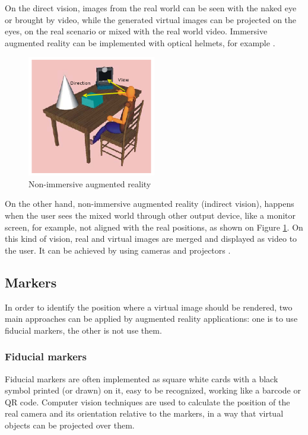 \documentclass[msc, a4paper, classic, en]{ufbathesis}
\begin{document}
On the direct vision, images from the real world can be seen with the naked eye or brought by video, while the generated virtual images can be projected on the eyes, on the real scenario or mixed with the real world video. Immersive augmented reality can be implemented with optical helmets, for example \cite{tori2006fundamentos}.

\begin{figure}
\centering
\includegraphics[width=0.5\textwidth]{images/indirect.png}
\caption{Non-immersive augmented reality}
\label{fig:indirect}
\end{figure}

On the other hand, non-immersive augmented reality (indirect vision), happens when the user sees the mixed world through other output device, like a monitor screen, for example, not aligned with the real positions, as shown on Figure \ref{fig:indirect}. On this kind of vision, real and virtual images are merged and displayed as video to the user. It can be achieved by using cameras and projectors \cite{tori2006fundamentos}.

\subsection{Markers}

In order to identify the position where a virtual image should be rendered, two main approaches can be applied by augmented reality applications: one is to use fiducial markers, the other is not use them.

\subsubsection{Fiducial markers}

Fiducial markers are often implemented as square white cards with a black symbol printed (or drawn) on it, easy to be recognized, working like a barcode or QR code. Computer vision techniques are used to calculate the position of the real camera and its orientation relative to the markers, in a way that virtual objects can be projected over them.
\end{document}
